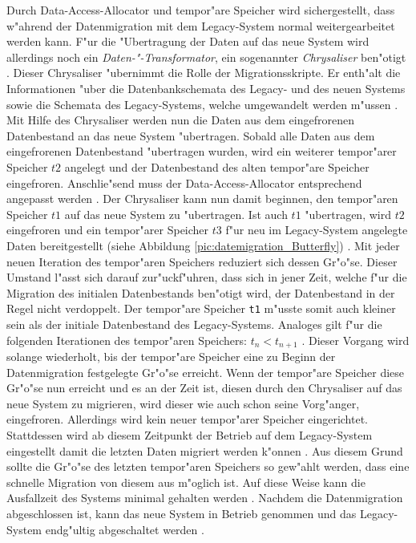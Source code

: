 Durch Data-Access-Allocator und tempor"are Speicher wird sichergestellt, dass w"ahrend der Datenmigration mit dem Legacy-System normal weitergearbeitet werden kann. F"ur die "Ubertragung der Daten auf das neue System wird allerdings noch ein \textit{Daten-"-Transformator}, ein sogenannter \textit{Chrysaliser} ben"otigt \citep[S.~202]{wuLawlessBisbal-1997}. Dieser Chrysaliser "ubernimmt die Rolle der Migrationsskripte. Er enth"alt die Informationen "uber die Datenbankschemata des Legacy- und des neuen Systems sowie die Schemata des Legacy-Systems, welche umgewandelt werden m"ussen \citep[S.~202]{wuLawlessBisbal-1997}. 
\lb
Mit Hilfe des Chrysaliser werden nun die Daten aus dem eingefrorenen Datenbestand an das neue System "ubertragen. Sobald alle Daten aus dem eingefrorenen Datenbestand "ubertragen wurden, wird ein weiterer tempor"arer Speicher $t2$ angelegt und der Datenbestand des alten tempor"are Speicher eingefroren. Anschlie"send muss der Data-Access-Allocator entsprechend angepasst werden \citep[S.~202]{wuLawlessBisbal-1997}. Der Chrysaliser kann nun damit beginnen, den tempor"aren Speicher $t1$ auf das neue System zu "ubertragen. Ist auch $t1$ "ubertragen, wird $t2$ eingefroren und ein tempor"arer Speicher $t3$ f"ur neu im Legacy-System angelegte Daten bereitgestellt (siehe Abbildung \ref{pic:datemigration_Butterfly}) \citep[S.~202]{wuLawlessBisbal-1997}. Mit jeder neuen Iteration des tempor"aren Speichers reduziert sich dessen Gr"o"se. Dieser Umstand l"asst sich darauf zur"uckf"uhren, dass sich in jener Zeit, welche f"ur die Migration des initialen Datenbestands ben"otigt wird, der Datenbestand in der Regel nicht verdoppelt. Der tempor"are Speicher \texttt{t1} m"usste somit auch kleiner sein als der initiale Datenbestand des Legacy-Systems. Analoges gilt f"ur die folgenden Iterationen des tempor"aren Speichers: \textit{$t_n <t_{n+1}$} \citep[S.~202]{wuLawlessBisbal-1997}. 
\lb
Dieser Vorgang wird solange wiederholt, bis der tempor"are Speicher eine zu Beginn der Datenmigration festgelegte Gr"o"se erreicht. Wenn der tempor"are Speicher diese Gr"o"se nun erreicht und es an der Zeit ist, diesen durch den Chrysaliser auf das neue System zu migrieren, wird dieser wie auch schon seine Vorg"anger, eingefroren. Allerdings wird kein neuer tempor"arer Speicher eingerichtet. Stattdessen wird ab diesem Zeitpunkt der Betrieb auf dem Legacy-System eingestellt damit die letzten Daten migriert werden k"onnen \citep[S.~202]{wuLawlessBisbal-1997}. Aus diesem Grund sollte die Gr"o"se des letzten tempor"aren Speichers so gew"ahlt werden, dass eine schnelle Migration von diesem aus m"oglich ist. Auf diese Weise kann die Ausfallzeit des Systems minimal gehalten werden \citep[S.~202]{wuLawlessBisbal-1997}. Nachdem die Datenmigration abgeschlossen ist, kann das neue System in Betrieb genommen und das Legacy-System endg"ultig abgeschaltet werden \citep[S.~204]{wuLawlessBisbal-1997}.
